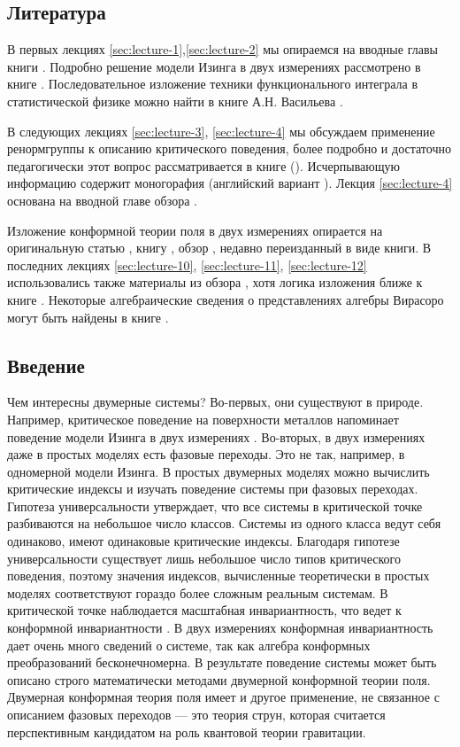 \documentclass[a4paper,12pt]{article}
\theoremstyle{definition}
\theoremstyle{definition}
\theoremstyle{definition}
\begin{document}
\subsection{Литература}
\label{sec:literature}
В первых лекциях \ref{sec:lecture-1},\ref{sec:lecture-2} мы опираемся на вводные главы книги \cite{difrancesco1997cft}. Подробно решение  модели Изинга в двух измерениях рассмотрено в книге  \cite{belavin2001lect}. Последовательное изложение техники функционального интеграла в статистической физике можно найти в книге А.Н. Васильева \cite{vasiliev1976}.

В следующих лекциях \ref{sec:lecture-3}, \ref{sec:lecture-4} мы обсуждаем применение ренормгруппы к описанию критического поведения, более подробно и достаточно педагогически этот вопрос рассматривается в книге \cite{ma1980} (\cite{ma2000modern}). Исчерпывающую информацию содержит моногорафия \cite{vasiliev1998} (английский вариант \cite{Vasilev:1027193}).
Лекция \ref{sec:lecture-4} основана на вводной главе обзора \cite{Ravanini:2000st}.

Изложение конформной теории поля в двух измерениях опирается на оригинальную статью \cite{belavin1984ics}, книгу \cite{difrancesco1997cft}, обзор \cite{zamolodchikov1989rus,zamolodchikov1989conformal}, недавно переизданный в виде книги. В последних лекциях \ref{sec:lecture-10}, \ref{sec:lecture-11}, \ref{sec:lecture-12} использовались также материалы из обзора \cite{Ginsparg:1988ui}, хотя логика изложения ближе к книге \cite{difrancesco1997cft}. Некоторые алгебраические сведения о представлениях алгебры Вирасоро  могут быть найдены в книге \cite{golod2001}.

\subsection{Введение}
\label{sec:intro}
Чем интересны двумерные системы? Во-первых, они существуют в природе. Например, критическое поведение на поверхности металлов напоминает поведение модели Изинга в двух измерениях \cite{campuzano1985110}. Во-вторых, в двух измерениях даже в простых моделях есть фазовые переходы. Это не так, например,  в одномерной модели Изинга. В простых двумерных моделях можно вычислить критические индексы и изучать поведение системы при фазовых переходах. Гипотеза универсальности утверждает, что все системы в критической точке разбиваются на небольшое число классов. Системы из одного класса ведут себя одинаково, имеют одинаковые критические индексы. Благодаря гипотезе универсальности существует лишь небольшое число типов критического поведения, поэтому значения индексов, вычисленные теоретически в простых моделях соответствуют гораздо более сложным реальным системам.
В критической точке наблюдается масштабная инвариантность, что ведет к конформной инвариантности \cite{Polyakov:1970xd}. В двух измерениях конформная инвариантность дает очень много сведений о системе, так как алгебра конформных преобразований бесконечномерна. В результате поведение системы может быть описано строго математически методами двумерной конформной теории поля. Двумерная конформная теория поля имеет и другое применение, не связанное с описанием фазовых переходов --- это теория струн, которая считается перспективным кандидатом на роль квантовой теории гравитации.
\end{document}
